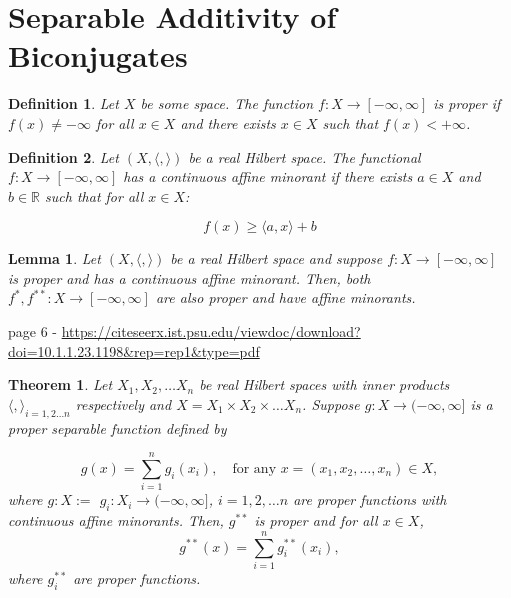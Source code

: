 \documentclass[11pt]{article}
\newtheorem{definition}{Definition}
\newtheorem{theorem}{Theorem}
\newtheorem{lemma}{Lemma}
\newcommand{\R}{\mathbb{R}}
\begin{document}
	\section{Separable Additivity of Biconjugates}
	
	\begin{definition}
		Let $X$ be some space. The function $f:X\to[-\infty, \infty]$ is proper if $f(x)\neq -\infty$ for all $x\in X$ and there exists $x\in X$ such that $f(x) < +\infty$.
		\end{definition}
	\begin{definition}
		Let $(X,\langle, \rangle)$ be a real Hilbert space. The functional $f:X\to[-\infty,\infty]$ has a continuous affine minorant if there exists $a\in X$ and $b\in\R$ such that for all $x\in X$:
		
		\[	f(x)\geq \langle a, x \rangle + b
				\]
		\end{definition}
	
	\begin{lemma}
		\label{lem:proper_affine}
		Let $(X,\langle, \rangle)$ be a real Hilbert space and suppose $f:X\to[-\infty, \infty]$ is proper and has a continuous affine minorant. Then, both $f^{*}, f^{**}:X\to[-\infty, \infty]$ are also proper and have affine minorants.
		\end{lemma}
	
		\noindent page 6 - \url{https://citeseerx.ist.psu.edu/viewdoc/download?doi=10.1.1.23.1198&rep=rep1&type=pdf}
	
	\begin{theorem}
		Let $X_{1}, X_{2}, \ldots X_{n}$ be real Hilbert spaces with inner products $\langle ,\rangle_{i=1,2\ldots n}$ respectively and $X = X_{1}\times X_{2}\times \ldots X_{n}$.
		Suppose $g:X\to(-\infty,\infty]$ is a proper separable function defined by
		
		\[	g(x) = \sum_{i=1}^{n}g_{i}(x_i), \quad\text{for any }x=(x_1, x_2, \ldots, x_n)\in X,
		\]
		where  $g:X:=$ $g_{i}:X_{i}\to(-\infty, \infty]$, $i=1,2,\ldots n$ are proper functions with continuous affine minorants. Then, $g^{**}$ is proper and for all $x\in X$,
		\[	g^{**}(x) = \sum_{i=1}^{n} g_{i}^{**}(x_i),
		\]
		where $g^{**}_{i}$ are proper functions.
		\end{theorem}
		
\end{document}
